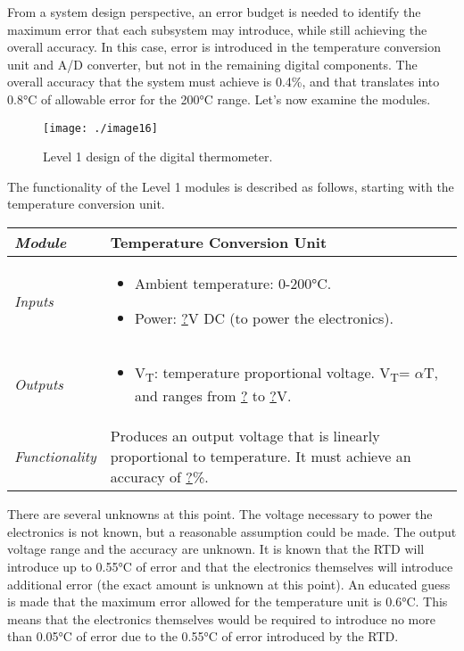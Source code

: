 From a system design perspective, an error budget is needed to identify
the maximum error that each subsystem may introduce, while still
achieving the overall accuracy. In this case, error is introduced in the
temperature conversion unit and A/D converter, but not in the remaining
digital components. The overall accuracy that the system must achieve is
0.4\%, and that translates into 0.8°C of allowable error for the 200°C
range. Let's now examine the modules.

\begin{figure}
\texttt{[image: ./image16]}
\caption{Level 1 design of the digital thermometer.}
\label{figure:level1DigitalThermo}
\end{figure}

The functionality of the Level 1 modules is described as follows,
starting with the temperature conversion unit.

\begin{table}
\begin{tabular}{|l|m{10cm}|}
\hline
\emph{Module} & Temperature Conversion Unit\\ \hline
\emph{Inputs} & 
\begin{itemize}
\item  Ambient temperature: 0-200°C.
\item  Power: \ul{?}V DC (to power the electronics).
\end{itemize}  \\ \hline
\emph{Outputs} & 
\begin{itemize}
\item  V\textsubscript{T}: temperature proportional voltage.
  V\textsubscript{T}= \underline{$\alpha$}T, and ranges from \underline{?} to \underline{?}V.
\end{itemize}\\ \hline
\emph{Functionality} & Produces an output voltage that is linearly
proportional to temperature. It must achieve an accuracy of \underline{?}\%. \\ \hline
\end{tabular}
\end{table}

There are several unknowns at this point. The voltage necessary to power
the electronics is not known, but a reasonable assumption could be made.
The output voltage range and the accuracy are unknown. It is known that
the RTD will introduce up to 0.55°C of error and that the electronics
themselves will introduce additional error (the exact amount is unknown
at this point). An educated guess is made that the maximum error allowed
for the temperature unit is 0.6°C. This means that the electronics
themselves would be required to introduce no more than 0.05°C of error
due to the 0.55°C of error introduced by the RTD.

